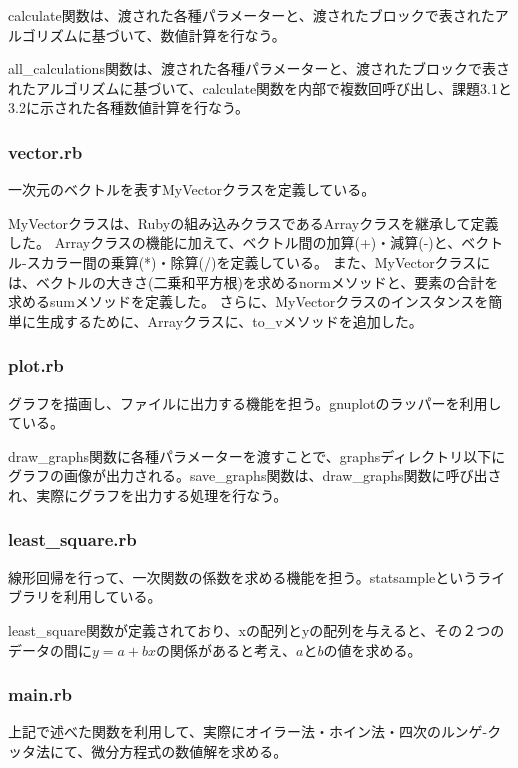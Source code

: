\documentclass[11pt]{jsarticle}
\begin{document}
                calculate関数は、渡された各種パラメーターと、渡されたブロックで表されたアルゴリズムに基づいて、数値計算を行なう。

                all\_calculations関数は、渡された各種パラメーターと、渡されたブロックで表されたアルゴリズムに基づいて、calculate関数を内部で複数回呼び出し、課題3.1と3.2に示された各種数値計算を行なう。

            \subsubsection*{vector.rb}
                一次元のベクトルを表すMyVectorクラスを定義している。

                MyVectorクラスは、Rubyの組み込みクラスであるArrayクラスを継承して定義した。
                Arrayクラスの機能に加えて、ベクトル間の加算(+)・減算(-)と、ベクトル-スカラー間の乗算(*)・除算(/)を定義している。
                また、MyVectorクラスには、ベクトルの大きさ(二乗和平方根)を求めるnormメソッドと、要素の合計を求めるsumメソッドを定義した。
                さらに、MyVectorクラスのインスタンスを簡単に生成するために、Arrayクラスに、to\_vメソッドを追加した。

            \subsubsection*{plot.rb}
                グラフを描画し、ファイルに出力する機能を担う。gnuplotのラッパーを利用している。

                draw\_graphs関数に各種パラメーターを渡すことで、graphsディレクトリ以下にグラフの画像が出力される。save\_graphs関数は、draw\_graphs関数に呼び出され、実際にグラフを出力する処理を行なう。

            \subsubsection*{least\_square.rb}
                線形回帰を行って、一次関数の係数を求める機能を担う。statsampleというライブラリを利用している。

                least\_square関数が定義されており、xの配列とyの配列を与えると、その２つのデータの間に$y=a+bx$の関係があると考え、$a$と$b$の値を求める。

            \subsubsection*{main.rb}
                上記で述べた関数を利用して、実際にオイラー法・ホイン法・四次のルンゲ-クッタ法にて、微分方程式の数値解を求める。
\end{document}
